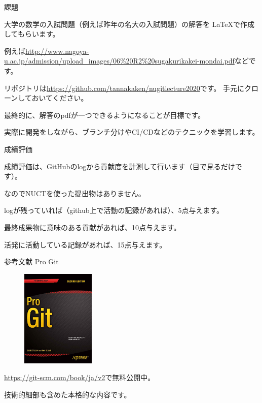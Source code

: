 \documentclass[12pt, unicode]{beamer}
\begin{document}
\begin{frame}{課題}

大学の数学の入試問題（例えば昨年の名大の入試問題）の解答を \LaTeX で作成してもらいます。

例えば\url{http://www.nagoya-u.ac.jp/admission/upload_images/06\%20R2\%20sugakurikakei-mondai.pdf}などです。

リポジトリは\url{https://github.com/tannakaken/nugitlecture2020}です。
手元にクローンしておいてください。

最終的に、解答のpdfが一つできるようになることが目標です。

実際に開発をしながら、ブランチ分けやCI/CDなどのテクニックを学習します。

\end{frame}
\begin{frame}{成績評価}

成績評価は、GitHubのlogから貢献度を計測して行います（目で見るだけです）。

なのでNUCTを使った提出物はありません。

logが残っていれば（github上で活動の記録があれば）、5点与えます。

最終成果物に意味のある貢献があれば、10点与えます。

活発に活動している記録があれば、15点与えます。

\end{frame}
\begin{frame}{参考文献}
{\huge Pro Git}

\begin{figure}
\includegraphics[width=100pt]{progit2.png}
\end{figure}

\url{https://git-scm.com/book/ja/v2}で無料公開中。

技術的細部も含めた本格的な内容です。

\end{frame}
\end{document}

